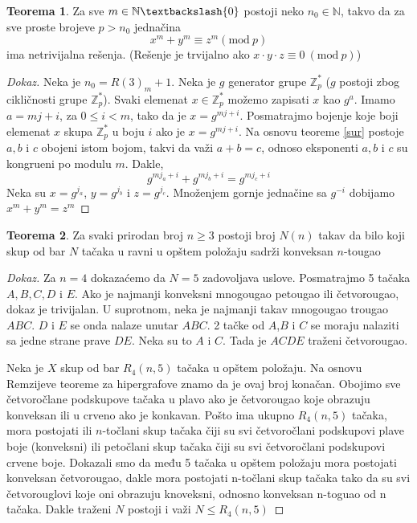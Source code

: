 \documentclass{article}
\theoremstyle{definition}
\newtheorem{teorema}{Teorema}[section]
\newcommand{\dokaz}[1]{\begin{proof}[Dokaz]#1\end{proof}}
\begin{document}
	\begin{teorema} \label{sur2}
		Za sve $m \in \mathbb{N} \textbackslash \{0\}$ postoji neko $n_{0} \in \mathbb{N}$, takvo da za sve proste brojeve $p>n_{0}$ jednačina
		\[
		x^{m}+y^{m}\equiv z^{m} (\mathrm{mod} \: p) 
		\]
		ima netrivijalna rešenja. (Rešenje je trvijalno ako $x\cdot y \cdot z\equiv 0\: (\mathrm{mod} \: p)$)
	\end{teorema}
	\dokaz{
		Neka je $n_0=R(3)_m+1$. Neka je $g$ generator grupe $\mathbb{Z}_{p}^{*} $ ($g$ postoji zbog cikličnosti grupe $\mathbb{Z}_{p}^{*}$). Svaki elemenat $x\in\mathbb{Z}_{p}^{*}$ možemo zapisati $x$ kao $g^a$. Imamo $a=mj+i$, za $0\leq i < m$, tako da je $x=g^{mj+i}$. Posmatrajmo bojenje koje boji elemenat $x$ skupa $\mathbb{Z}_{p}^{*}$ u boju $i$ ako je $x=g^{mj+i}$. Na osnovu teoreme \ref{sur} postoje $a, b$ i $c$ obojeni istom bojom, takvi da važi $a+b=c$, odnoso eksponenti $a, b$ i $c$ su kongrueni po modulu $m$. Dakle,
		\[
		g^{mj_{a}+i}+g^{mj_{b}+i}=g^{mj_{c}+i}
		\]
		Neka su $x=g^{j_{a}}$, $y=g^{j_{b}}$ i $z=g^{j_{c}}$. Množenjem gornje jednačine sa $g^{-i}$ dobijamo $x^m+y^m=z^m$  
	}

	\begin{teorema}
		Za svaki prirodan broj $n\geq 3$ postoji broj $N(n)$ takav da bilo koji skup od bar $N$ tačaka u ravni u opštem položaju sadrži konveksan $n$-tougao
	\end{teorema}
	\dokaz{
		Za $n=4$ dokazaćemo da $N=5$ zadovoljava uslove. Posmatrajmo 5 tačaka $A,B,C,D$ i $E$. Ako je najmanji konveksni mnogougao petougao ili četvorougao, dokaz je trivijalan. U suprotnom, neka je najmanji takav mnogougao trougao $ABC$. $D$ i $E$ se onda nalaze unutar $ABC$. 2 tačke od $A$,$B$ i $C$ se moraju nalaziti sa jedne strane prave $DE$. Neka su to $A$ i $C$. Tada je $ACDE$ traženi četvorougao.
		
		Neka je $X$ skup od bar $R_4(n,5)$ tačaka u opštem položaju. Na osnovu Remzijeve teoreme za hipergrafove znamo da je ovaj broj konačan. Obojimo sve četvoročlane podskupove tačaka u plavo ako je četvorougao koje obrazuju konveksan ili u crveno ako je konkavan. Pošto ima ukupno $R_{4}(n,5)$ tačaka, mora postojati ili $n$-točlani skup tačaka čiji su svi četvoročlani podskupovi plave boje (konveksni) ili petočlani skup tačaka čiji su svi četvoročlani podskupovi crvene boje. Dokazali smo da među 5 tačaka u opštem položaju mora postojati konveksan četvorougao, dakle mora postojati n-točlani skup tačaka tako da su svi četvorouglovi koje oni obrazuju knoveksni, odnosno konveksan n-toguao od n tačaka. Dakle traženi $N$ postoji i važi $N\leq R_{4}(n,5)$
		
	}
	
\end{document}
